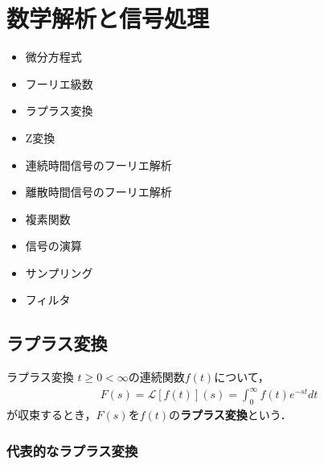 \chapter{数学解析と信号処理}

\begin{minipage}{0.33\linewidth}
    \begin{itemize}
        \item 微分方程式
        \item フーリエ級数
        \item ラプラス変換
        \item Z変換
    \end{itemize}
\end{minipage}
\hspace{0.05\linewidth}
\begin{minipage}{0.33\linewidth}
    \begin{itemize}
        \item 連続時間信号のフーリエ解析
        \item 離散時間信号のフーリエ解析
        \item 複素関数
    \end{itemize}
\end{minipage}
\hspace{0.05\linewidth}
\begin{minipage}{0.33\linewidth}
    \begin{itemize}
        \item 信号の演算
        \item サンプリング
        \item フィルタ
    \end{itemize}
\end{minipage}

\section{ラプラス変換}\label{sec:laplace_transform}

\begin{defbox}{ラプラス変換}
    $t \ge 0 < \infty$の連続関数$f(t)$について，
    \begin{eqnarray}
        F(s) = \mathcal{L}[f(t)](s) = \int_{0}^{\infty} f(t)e^{-st} dt
        \label{eq:laplace_transform}
    \end{eqnarray}
    が収束するとき，$F(s)$を$f(t)$の\textbf{ラプラス変換}という．
\end{defbox}

\subsection{代表的なラプラス変換}

